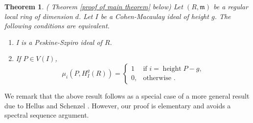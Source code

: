 \documentclass[12pt,reqno]{amsart}
\newtheorem{theorem}{Theorem}[section]
\theoremstyle{definition}
\newcommand{\m}{\mathfrak{m}}
\newcommand{\height}{\operatorname{height}}
\begin{document}
\begin{theorem}( Theorem \ref{proof of main theorem} below)
    Let $(R,\m)$ be a regular local ring of dimension $d$. Let $I$ be a Cohen-Macaulay ideal of height $g$. The following conditions are equivalent.
    \begin{enumerate}[label=(\alph*), font=\upshape]
        \item I is a Peskine-Szpiro ideal of $R$.
        \item If $P\in V(I)$,
         $$
\mu_i(P,H^g_I(R)) =
\begin{cases}
1 & \text{if } i=\height P-g,\\
0, & \text{otherwise }.
\end{cases}
$$
    \end{enumerate}
\end{theorem}
We remark that the above 
result follows as a special case of a more general result due to Hellus and Schenzel \cite[Theorem 3.2]{HS08}. However, our proof is elementary and avoids a spectral sequence argument.
\end{document}
